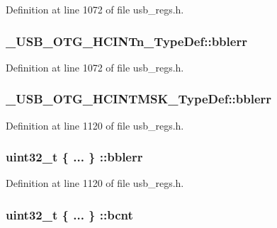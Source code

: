 Definition at line 1072 of file usb\-\_\-regs.\-h.

\hypertarget{group___u_s_b___o_t_g___d_r_i_v_e_r_ga4d85c4c35ee2da38a3840383ca9c32d4}{
\subsubsection[{bblerr}]{ \-\_\-\-U\-S\-B\-\_\-\-O\-T\-G\-\_\-\-H\-C\-I\-N\-Tn\-\_\-\-Type\-Def\-::bblerr}}\label{group___u_s_b___o_t_g___d_r_i_v_e_r_ga4d85c4c35ee2da38a3840383ca9c32d4}


Definition at line 1072 of file usb\-\_\-regs.\-h.

\hypertarget{group___u_s_b___o_t_g___d_r_i_v_e_r_ga5c30859fd2a1da1586244f740e77ffb2}{
\subsubsection[{bblerr}]{ \-\_\-\-U\-S\-B\-\_\-\-O\-T\-G\-\_\-\-H\-C\-I\-N\-T\-M\-S\-K\-\_\-\-Type\-Def\-::bblerr}}\label{group___u_s_b___o_t_g___d_r_i_v_e_r_ga5c30859fd2a1da1586244f740e77ffb2}


Definition at line 1120 of file usb\-\_\-regs.\-h.

\hypertarget{group___u_s_b___o_t_g___d_r_i_v_e_r_gaa213e97e0d2de21224f33bea251ae564}{
\subsubsection[{bblerr}]{\setlength{\rightskip}{0pt plus 5cm}uint32\-\_\-t \{ ... \} \-::bblerr}}\label{group___u_s_b___o_t_g___d_r_i_v_e_r_gaa213e97e0d2de21224f33bea251ae564}


Definition at line 1120 of file usb\-\_\-regs.\-h.

\hypertarget{group___u_s_b___o_t_g___d_r_i_v_e_r_gaf14d4b3e27a0bf9fa2acdd36fa34332c}{
\subsubsection[{bcnt}]{\setlength{\rightskip}{0pt plus 5cm}uint32\-\_\-t \{ ... \} \-::bcnt}}\label{group___u_s_b___o_t_g___d_r_i_v_e_r_gaf14d4b3e27a0bf9fa2acdd36fa34332c}



